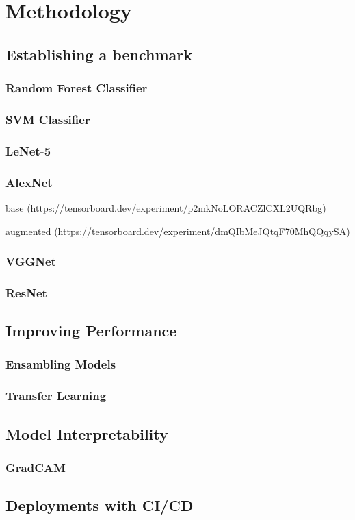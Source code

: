 \chapter{Methodology} \label{chap:methodology}

\section{Establishing a benchmark}
\subsection{Random Forest Classifier}

\subsection{SVM Classifier}

\subsection{LeNet-5}

\subsection{AlexNet}
base (https://tensorboard.dev/experiment/p2mkNoLORACZlCXL2UQRbg)


augmented (https://tensorboard.dev/experiment/dmQIbMeJQtqF70MhQQqySA)

\subsection{VGGNet}

\subsection{ResNet}

\section{Improving Performance}
\subsection{Ensambling Models}
\subsection{Transfer Learning}

\section{Model Interpretability}
\subsection{GradCAM}

\section{Deployments with CI/CD}
